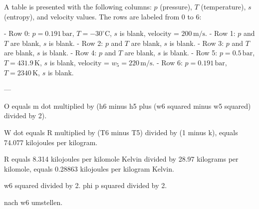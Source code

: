 A table is presented with the following columns: \( p \) (pressure), \( T \) (temperature), \( s \) (entropy), and velocity values. The rows are labeled from 0 to 6:  

- Row 0: \( p = 0.191 \, \text{bar} \), \( T = -30^\circ \text{C} \), \( s \) is blank, velocity = \( 200 \, \text{m/s} \).  
- Row 1: \( p \) and \( T \) are blank, \( s \) is blank.  
- Row 2: \( p \) and \( T \) are blank, \( s \) is blank.  
- Row 3: \( p \) and \( T \) are blank, \( s \) is blank.  
- Row 4: \( p \) and \( T \) are blank, \( s \) is blank.  
- Row 5: \( p = 0.5 \, \text{bar} \), \( T = 431.9 \, \text{K} \), \( s \) is blank, velocity = \( w_5 = 220 \, \text{m/s} \).  
- Row 6: \( p = 0.191 \, \text{bar} \), \( T = 2340 \, \text{K} \), \( s \) is blank.  

---

O equals m dot multiplied by (h6 minus h5 plus (w6 squared minus w5 squared) divided by 2).  

W dot equals R multiplied by (T6 minus T5) divided by (1 minus k), equals 74.077 kilojoules per kilogram.  

R equals 8.314 kilojoules per kilomole Kelvin divided by 28.97 kilograms per kilomole, equals 0.28863 kilojoules per kilogram Kelvin.  

w6 squared divided by 2.  
phi p squared divided by 2.  

nach w6 umstellen.